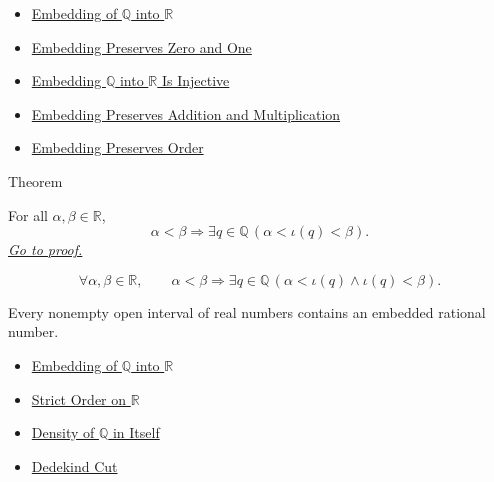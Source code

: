 \begin{dependencies}
\begin{itemize}
  \item \hyperref[def:real-chapter-embedding-q-into-r]{Embedding of $\mathbb{Q}$ into $\mathbb{R}$}
  \item \hyperref[thm:embedding-q-into-r-preserves-zero-one]{Embedding Preserves Zero and One}
  \item \hyperref[thm:embedding-q-into-r-injective]{Embedding $\mathbb{Q}$ into $\mathbb{R}$ Is Injective}
  \item \hyperref[thm:embedding-q-into-r-preserves-arithmetic]{Embedding Preserves Addition and Multiplication}
  \item \hyperref[thm:embedding-q-into-r-preserves-order]{Embedding Preserves Order}
\end{itemize}
\end{dependencies}

\begin{theorembox}{Theorem}
\begin{theorem}
\label{thm:density-of-q-in-r}
For all $\alpha,\beta\in\mathbb{R}$,
\[
\alpha<\beta \Longrightarrow \exists q\in\mathbb{Q}\,(\alpha<\iota(q)<\beta).
\]
\hyperref[prf:density-of-q-in-r]{\textit{Go to proof.}}
\end{theorem}
\end{theorembox}

\begin{remark*}
\[
\forall \alpha,\beta\in\mathbb{R},\qquad
\alpha<\beta\Longrightarrow
\exists q\in\mathbb{Q}\,(\alpha<\iota(q)\land \iota(q)<\beta).
\]
\end{remark*}

\begin{remark*}[Interpretation]
Every nonempty open interval of real numbers contains an embedded rational number.
\end{remark*}

\begin{dependencies}
\begin{itemize}
  \item \hyperref[def:real-chapter-embedding-q-into-r]{Embedding of $\mathbb{Q}$ into $\mathbb{R}$}
  \item \hyperref[def:strict-order-on-r]{Strict Order on $\mathbb{R}$}
  \item \hyperref[thm:density-of-q]{Density of $\mathbb{Q}$ in Itself}
  \item \hyperref[def:dedekind-cut]{Dedekind Cut}
\end{itemize}
\end{dependencies}

